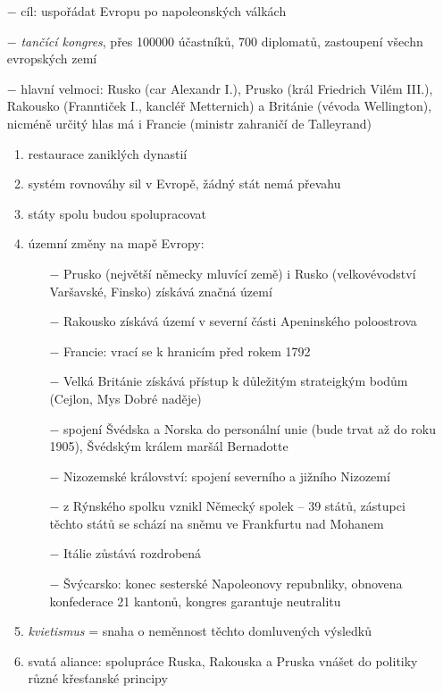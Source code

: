 \documentclass{article}
\begin{document}
\begin{itemize}
    \vspace{-0.5em}
    \setlength\itemsep{0.15em}
    \item[$-$] cíl: uspořádat Evropu po napoleonských válkách
    \item[$-$] \textit{tančící kongres}, přes 100000 účastníků, 700 diplomatů, zastoupení všechn evropských zemí
    \item[$-$] hlavní velmoci: Rusko (car Alexandr I.), Prusko (král Friedrich Vilém III.), Rakousko (Franntiček I., kancléř Metternich) a Británie (vévoda Wellington), nicméně určitý hlas má i Francie (ministr zahraničí de Talleyrand)
    \begin{enumerate}
        \vspace{-0.5em}
        \setlength\itemsep{0.15em}
        \item restaurace zaniklých dynastií
        \item systém rovnováhy sil v Evropě, žádný stát nemá převahu
        \item státy spolu budou spolupracovat
        \item územní změny na mapě Evropy:
        \begin{itemize}
            \vspace{-0.5em}
            \setlength\itemsep{0.15em}
            \item[$-$] Prusko (největší německy mluvící země) i Rusko (velkovévodství Varšavské, Finsko) získává značná území
            \item[$-$] Rakousko získává území v severní části Apeninského poloostrova
            \item[$-$] Francie: vrací se k hranicím před rokem 1792
            \item[$-$] Velká Británie získává přístup k důležitým strateigkým bodům (Cejlon, Mys Dobré naděje)
            \item[$-$] spojení Švédska a Norska do personální unie (bude trvat až do roku 1905), Švédským králem maršál Bernadotte
            \item[$-$] Nizozemské království: spojení severního a jižního Nizozemí
            \item[$-$] z Rýnského spolku vznikl Německý spolek -- 39 států, zástupci těchto států se schází na sněmu ve Frankfurtu nad Mohanem
            \item[$-$] Itálie zůstává rozdrobená
            \item[$-$] Švýcarsko: konec sesterské Napoleonovy repubnliky, obnovena konfederace 21 kantonů, kongres garantuje neutralitu
        \end{itemize}
        \item \textit{kvietismus} = snaha o neměnnost těchto domluvených výsledků
        \item svatá aliance: spolupráce Ruska, Rakouska a Pruska vnášet do politiky různé křesťanské principy
    \end{enumerate}
\end{itemize}
\end{document}

